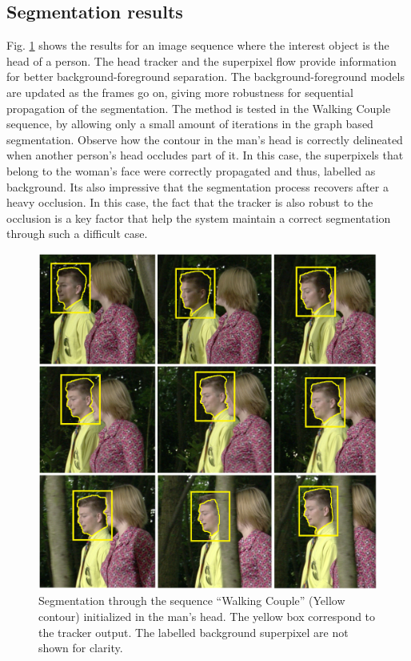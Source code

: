 \subsection{Segmentation results}

Fig. \ref{figurelabel_walking} shows the results for an image sequence where the interest object is the head of a person.
The head tracker and the superpixel flow provide information for better background-foreground separation. The
background-foreground models are updated as the frames go on, giving more robustness for sequential
propagation of the segmentation. The method is tested in the Walking Couple sequence, by allowing only a small amount of iterations in the
graph based segmentation. Observe how the contour in the man's head is correctly delineated when
another person's head occludes part of it. In this case, the superpixels that belong to the woman’s face
were correctly propagated and thus, labelled as background. Its also impressive that the segmentation process recovers after a heavy occlusion.
In this case, the fact that the tracker is also robust to the occlusion is a key factor that help the system maintain a correct segmentation through such a difficult 
case.

   \begin{figure}[thpb]
      \centering
      \includegraphics[width=1.0\textwidth]{../images/Sequence.png}
      \caption{Segmentation through the sequence “Walking
	       Couple” (Yellow contour) initialized in the man’s head. The yellow box correspond to the tracker output.
	        The labelled background superpixel are not shown for clarity.}
      \label{figurelabel_walking}
   \end{figure}


